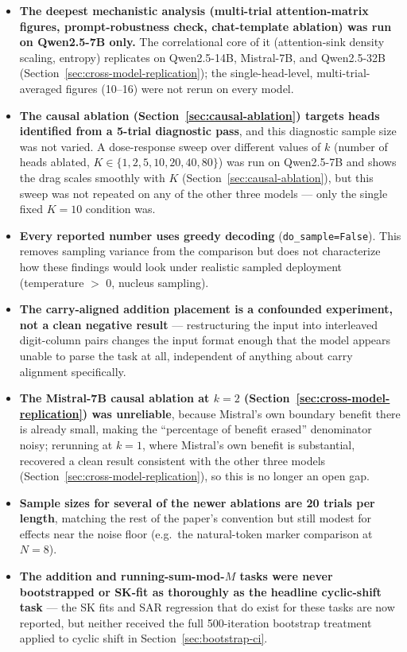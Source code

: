 \documentclass[11pt]{article}
\begin{document}
\begin{itemize}
\item \textbf{The deepest mechanistic analysis (multi-trial attention-matrix figures, prompt-robustness check, chat-template ablation) was run on Qwen2.5-7B only.} The correlational core of it (attention-sink density scaling, entropy) replicates on Qwen2.5-14B, Mistral-7B, and Qwen2.5-32B (Section~\ref{sec:cross-model-replication}); the single-head-level, multi-trial-averaged figures (10--16) were not rerun on every model.
\item \textbf{The causal ablation (Section~\ref{sec:causal-ablation}) targets heads identified from a 5-trial diagnostic pass}, and this diagnostic sample size was not varied. A dose-response sweep over different values of $k$ (number of heads ablated, $K\in\{1,2,5,10,20,40,80\}$) was run on Qwen2.5-7B and shows the drag scales smoothly with $K$ (Section~\ref{sec:causal-ablation}), but this sweep was not repeated on any of the other three models --- only the single fixed $K=10$ condition was.
\item \textbf{Every reported number uses greedy decoding} (\texttt{do\_sample=False}). This removes sampling variance from the comparison but does not characterize how these findings would look under realistic sampled deployment (temperature $>$ 0, nucleus sampling).
\item \textbf{The carry-aligned addition placement is a confounded experiment, not a clean negative result} --- restructuring the input into interleaved digit-column pairs changes the input format enough that the model appears unable to parse the task at all, independent of anything about carry alignment specifically.
\item \textbf{The Mistral-7B causal ablation at $k=2$ (Section~\ref{sec:cross-model-replication}) was unreliable}, because Mistral's own boundary benefit there is already small, making the ``percentage of benefit erased'' denominator noisy; rerunning at $k=1$, where Mistral's own benefit is substantial, recovered a clean result consistent with the other three models (Section~\ref{sec:cross-model-replication}), so this is no longer an open gap.
\item \textbf{Sample sizes for several of the newer ablations are 20 trials per length}, matching the rest of the paper's convention but still modest for effects near the noise floor (e.g.\ the natural-token marker comparison at $N=8$).
\item \textbf{The addition and running-sum-mod-$M$ tasks were never bootstrapped or SK-fit as thoroughly as the headline cyclic-shift task} --- the SK fits and SAR regression that do exist for these tasks are now reported, but neither received the full 500-iteration bootstrap treatment applied to cyclic shift in Section~\ref{sec:bootstrap-ci}.

\end{itemize}
\end{document}
